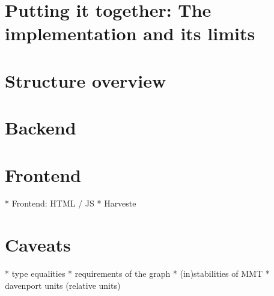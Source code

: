 \section{Putting it together: The implementation and its limits}

\section{Structure overview}
\section{Backend}
\section{Frontend}
\label{sec:frontend}
* Frontend: HTML / JS
* Harveste
\section{Caveats}
* type equalities
* requirements of the graph
* (in)stabilities of MMT
* davenport units (relative units)
